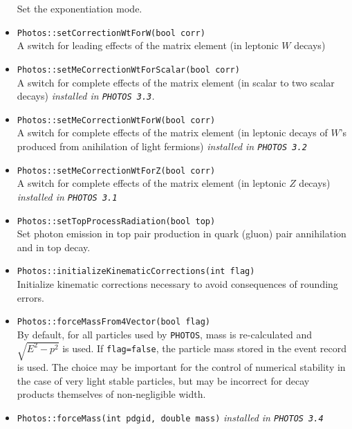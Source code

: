 \documentclass[]{Photos_interface_design}
\begin{document}
\begin{itemize}
        Set the exponentiation mode.
  \item {\tt Photos::setCorrectionWtForW(bool corr)} \\
         A switch for leading effects of the matrix element (in leptonic $W$ decays)
  \item {\tt Photos::setMeCorrectionWtForScalar(bool corr)} \\
         A switch for complete effects of the matrix element (in scalar to two scalar decays) {\it  installed in {\tt PHOTOS 3.3}.}
  \item {\tt Photos::setMeCorrectionWtForW(bool corr)} \\
         A switch for complete effects of the matrix element (in leptonic decays of $W$'s produced from anihilation of light fermions) {\it  installed in {\tt PHOTOS 3.2} }
  \item {\tt Photos::setMeCorrectionWtForZ(bool corr)} \\
         A switch for complete effects of the matrix element (in leptonic $Z$ decays) {\it  installed in {\tt PHOTOS 3.1} }
 \item {\tt Photos::setTopProcessRadiation(bool top)} \\
Set photon emission in top pair production in quark (gluon) pair annihilation
and in top decay.
  \item {\tt Photos::initializeKinematicCorrections(int flag)} \\
        Initialize kinematic corrections necessary to avoid consequences of rounding errors.
  \item {\tt Photos::forceMassFrom4Vector(bool flag)}  \\
        By default, for all particles used by {\tt PHOTOS}, 
        mass is re-calculated and $\sqrt{E^2-p^2}$ is used. 
        If {\tt flag=false}, the particle mass stored in the  event record 
        is used. The choice may be important for the control 
        of numerical stability in the case of very light stable particles, but may be incorrect for decay products 
        themselves of non-negligible width.
  \item {\tt Photos::forceMass(int pdgid, double mass)} {\it  installed in {\tt PHOTOS 3.4}} \\

\end{itemize}
\end{document}
